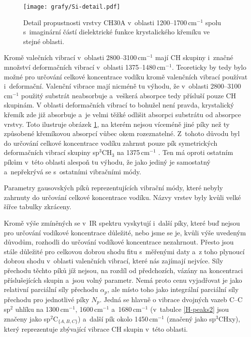 \begin{figure}[!tb]
	\texttt{[image: grafy/Si-detail.pdf]}
	\caption{Detail propustnosti vrstvy CH30A v~oblasti 1200--1700\,cm$^{-1}$ spolu s~ima\-gi\-nární částí dielektrické funkce krystalického křemíku ve stejné oblasti.}
	\label{Si-detail}
\end{figure}

Kromě valečních vibrací v~oblasti 2800--3100\,cm$^{-1}$ mají CH skupiny i~značné množství deformačních vibrací v~oblasti 1375--1480\,cm$^{-1}$. Teoreticky by tedy bylo možné pro určování celkové koncentrace vodíku kromě valenčních vibrací používat i~deformační. Valenční vibrace mají nicméně tu výhodu, že v~oblasti 2800--3100\,cm$^{-1}$ použitý substrát neabsorbuje a~veškerá absorpce tedy přísluší pouze CH skupinám. 
V oblasti deformačních vibrací to bohužel není pravda, krystalický křemík zde již absorbuje a~je velmi těžké odlišit absorpci substrátu od absorpce vrstvy. Toto ilustruje obrázek \ref{Si-detail}, na kterém nejsou víceméně jiné píky než ty způsobené křemíkovou absorpcí vůbec okem rozeznatelné. Z~tohoto důvodu byl do určování celkové koncentrace vodíku zahrnut pouze pík symetrických deformačních vibrací skupiny sp$^3$CH$_3$ na 1375\,cm$^{-1}$ \cite{Robertson2002}. Ten má oproti ostatním píkům v~této oblasti alespoň tu výhodu, že jako jediný je samostatný a~nepřekrývá se s~ostatními vibračními módy.

\begin{table}[!tbp]
 \centering
	\renewcommand{\tabcolsep}{4pt}
 
 \caption{Parametry gausovských píků reprezentujících vibrační módy, které nebyly zahrnuty do určování celkové koncentrace vodíku. Názvy vrstev byly kvůli velké šířce tabulky zkráceny.}
\label{H-peaks2}
\end{table}

Kromě výše zmíněných se v~IR spektru vyskytují i~další píky, které buď nejsou pro určování vodíkové koncentrace důležité, nebo jsme se je, kvůli výše uvedeným důvodům, rozhodli do určování vodíkové koncentrace nezahrnout. Přesto jsou stále důležité pro celkovou dobrou shodu fitu s~měřenými daty a~z toho plynoucí dobrou shodu v~oblasti valenčních vibrací, které nás zajímají nejvíce. Síly přechodu těchto píků jíž nejsou, na rozdíl od předchozích, vázány na koncentraci příslušejících skupin a~jsou volný parametr. 
Nemá proto cenu vyjadřovat je jako relativní parciální síly přechodu $\alpha_p$, ale místo toho jako integrální parciální síly přechodu pro jednotlivé píky $N_p$. Jedná se hlavně o vibrace dvojných vazeb C--C sp$^2$ uhlíku na 1300\,cm$^{-1}$, 1600\,cm$^{-1}$ a~1680\,cm$^{-1}$ \cite{Robertson2002, Theye2001, Zajickova2011} (v~tabulce \ref{H-peaks2} jsou značeny jako sp$^2$C$_{\{A,B,C\}}$) a~další pík okolo 1450\,cm$^{-1}$ (značený jako sp$^3$CHxy), který reprezentuje zbývající vibrace CH skupin v~této oblasti.

